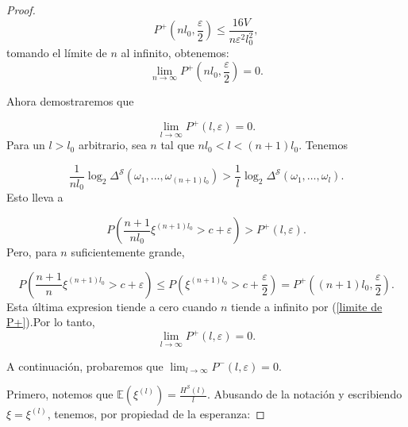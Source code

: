 \documentclass{report}
\begin{document}
\begin{proof}
    \[
    P^+\left(n l_0, \frac{\varepsilon}{2} \right) 
    \leq \frac{16V}{n \varepsilon^2 l_0^2},
    \]
    tomando el límite de $n$ al infinito, obtenemos:
    \begin{equation}\label{limite de P+}
        \lim_{n \to \infty} P^+\left(n l_0, \frac{\varepsilon}{2} \right) = 0.
    \end{equation}
\bigskip

    Ahora demostraremos que

    \[
    \lim_{l \to \infty} P^+(l, \varepsilon) = 0.
    \]
    Para un \( l > l_0 \) arbitrario, sea \( n \) tal que \( n l_0 < l < (n+1)l_0 \). Tenemos

    \[
    \frac{1}{n l_0} \log_2 \Delta^{\mathcal{S}}(\omega_1, \dots, \omega_{(n+1)l_0}) > \frac{1}{l} \log_2 \Delta^{\mathcal{S}}(\omega_1, \dots, \omega_l).
    \]
    Esto lleva a
    
    \[
    P\left( \frac{n+1}{n l_0} \xi^{(n+1)l_0} > c + \varepsilon \right) > P^+(l, \varepsilon).
    \]
    Pero, para \( n \) suficientemente grande,
    
    \[
    P\left( \frac{n+1}{n} \xi^{(n+1)l_0} > c + \varepsilon \right) 
    \leq P\left( \xi^{(n+1)l_0} > c + \frac{\varepsilon}{2} \right) 
    = P^+\left( (n+1)l_0, \frac{\varepsilon}{2} \right).
    \]
    Esta última expresion tiende a cero cuando $n$ tiende a infinito por (\ref{limite de P+}).Por lo tanto,
    \begin{equation}\label{eq 16}
    \lim_{l \to \infty} P^+(l, \varepsilon) = 0.
    \end{equation}
    \bigskip

    A continuación, probaremos que \( \lim_{l \to \infty} P^-(l, \varepsilon) = 0\).\newline
    
    Primero, notemos que \( \mathbb{E} (\xi^{(l)}) = \frac{H^{\mathcal{S}}(l)}{l} \). Abusando de la notación y escribiendo 
    $\xi=\xi^{(l)}$, tenemos, por propiedad de la esperanza:


\end{proof}
\end{document}
